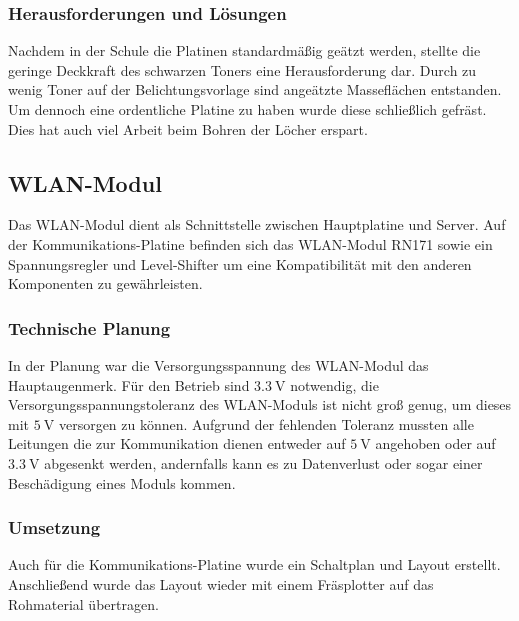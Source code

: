     \subsubsection{Herausforderungen und Lösungen}
    Nachdem in der Schule die Platinen standardmäßig geätzt werden, stellte die geringe Deckkraft des schwarzen Toners eine Herausforderung dar. Durch zu wenig Toner auf der
    Belichtungsvorlage sind angeätzte Masseflächen entstanden. Um dennoch eine ordentliche Platine zu haben wurde diese schließlich gefräst. Dies hat auch viel Arbeit beim
    Bohren der Löcher erspart.

  \subsection{WLAN-Modul}
  Das WLAN-Modul dient als Schnittstelle zwischen Hauptplatine und Server. Auf der Kommunikations-Platine befinden sich das WLAN-Modul RN171 sowie ein Spannungsregler und
  Level-Shifter um eine Kompatibilität mit den anderen Komponenten zu gewährleisten.

    \subsubsection{Technische Planung}
    In der Planung war die Versorgungsspannung des WLAN-Modul das Hauptaugenmerk. Für den Betrieb sind $\SI{3.3}{\volt}$ notwendig, die Versorgungsspannungstoleranz
    des WLAN-Moduls ist nicht groß genug, um dieses mit $\SI{5}{\volt}$ versorgen zu können.
    Aufgrund der fehlenden Toleranz mussten alle Leitungen die zur Kommunikation dienen entweder auf $\SI{5}{\volt}$ angehoben oder auf $\SI{3.3}{\volt}$ abgesenkt werden,
    andernfalls kann es zu Datenverlust oder sogar einer Beschädigung eines Moduls kommen.

    \subsubsection{Umsetzung}
    Auch für die Kommunikations-Platine wurde ein Schaltplan und Layout erstellt. Anschließend wurde das Layout wieder mit einem Fräsplotter auf das Rohmaterial übertragen.

